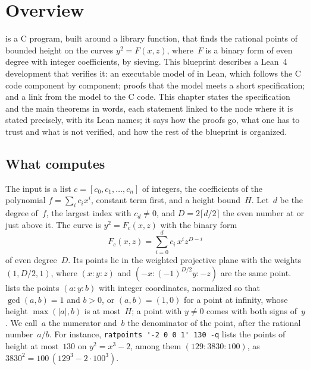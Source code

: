 \chapter{Overview}\label{chap:overview}

\ratpoints{} is a C program, built around a library function, that finds the rational points of
bounded height on the curves $y^2 = F(x, z)$, where~$F$ is a binary form of even degree with integer
coefficients, by sieving. This blueprint describes a Lean~4 development that verifies it: an
executable model of \ratpoints{} in Lean, which follows the C code component by component; proofs
that the model meets a short specification; and a link from the model to the C code. This chapter
states the specification and the main theorems in words, each statement linked to the node where
it is stated precisely, with its Lean names; it says how the proofs go, what one has to trust and
what is not verified, and how the rest of the blueprint is organized.

\section{What \ratpoints{} computes}\label{sec:overviewRatpoints}

The input is a list $c = [c_0, c_1, \dots, c_n]$ of integers, the coefficients of the polynomial
$f = \sum_i c_i x^i$, constant term first, and a height bound~$H$. Let~$d$ be the degree of~$f$,
the largest index with $c_d \ne 0$, and $D = 2 \lceil d/2 \rceil$ the even number at or just above it.
The curve is $y^2 = F_c(x, z)$ with the binary form
\[ F_c(x, z) = \sum_{i=0}^{d} c_i\, x^i z^{D - i} \]
of even degree~$D$. Its points lie in the weighted projective plane with the weights
$(1, D/2, 1)$, where $(x : y : z)$ and $(-x : (-1)^{D/2} y : -z)$ are the same point. \ratpoints{}
lists the points $(a : y : b)$ with integer coordinates, normalized so that $\gcd(a, b) = 1$ and
$b > 0$, or $(a, b) = (1, 0)$ for a point at infinity, whose height $\max(|a|, b)$ is at most~$H$;
a point with $y \ne 0$ comes with both signs of~$y$. We call~$a$ the numerator and~$b$ the
denominator of the point, after the rational number~$a/b$. For instance,
\verb|ratpoints '-2 0 0 1' 130 -q| lists the points of height at most~$130$ on $y^2 = x^3 - 2$,
among them $(129 : 3830 : 100)$, as $3830^2 = 100\,(129^3 - 2 \cdot 100^3)$.

